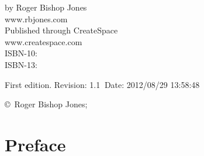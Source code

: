 \begin{titlepage}
\maketitle

\hspace{2in}

\vfill

\begin{centering}

\vfill

\vspace{0.1in}
by Roger Bishop Jones\\
www.rbjones.com\\
\vspace{0.2in}
Published through CreateSpace\\
www.createspace.com\\
\vspace{0.2in}
ISBN-10: \\
ISBN-13: \\
\vspace{0.2in}

{\footnotesize

First edition. $ $Revision: 1.1 $~$Date: 2012/08/29 13:58:48 $ $

\copyright\ Roger Bishop Jones;

}%

\end{centering}

\thispagestyle{empty}
\end{titlepage}

{\parskip=0pt\tableofcontents}

\vfill

\pagebreak

\chapter*{Preface}

\mainmatter



\backmatter

%
%




\printindex

\vfil


